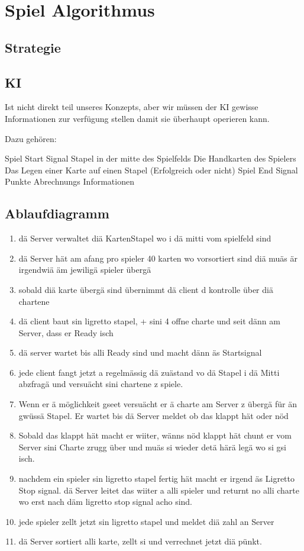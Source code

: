 \section{Spiel Algorithmus} 

\subsection{Strategie}

\subsection{KI}

Ist nicht direkt teil unseres Konzepts, aber wir müssen der KI gewisse Informationen zur verfügung stellen damit sie überhaupt operieren kann.

Dazu gehören:

Spiel Start Signal
Stapel in der mitte des Spielfelds
Die Handkarten des Spielers
Das Legen einer Karte auf einen Stapel (Erfolgreich oder nicht)
Spiel End Signal
Punkte Abrechnungs Informationen

\subsection{Ablaufdiagramm}

\begin{enumerate}
	\item dä Server verwaltet diä KartenStapel wo i dä mitti vom spielfeld sind
	\item dä Server hät am afang pro spieler 40 karten wo vorsortiert sind diä muäs är irgendwiä äm jewiligä spieler übergä
	\item sobald diä karte übergä sind übernimmt dä client d kontrolle über diä chartene
	\item dä client baut sin ligretto stapel, + sini 4 offne charte und seit dänn am Server, dass er Ready isch
	\item dä server wartet bis alli Ready sind und macht dänn äs Startsignal
	\item jede client fangt jetzt a regelmässig dä zuästand vo dä Stapel i dä Mitti abzfragä und versuächt sini chartene z spiele.
	\item Wenn er ä möglichkeit gseet versuächt er ä charte am Server z übergä für än gwüssä Stapel. Er wartet bis dä Server meldet ob das klappt hät oder nöd
	\item Sobald das klappt hät macht er wiiter, wänns nöd klappt hät chunt er vom Server sini Charte zrugg über und muäs si wieder detä härä legä wo si gsi isch.
	\item nachdem ein spieler sin ligretto stapel fertig hät macht er irgend äs Ligretto Stop signal. dä Server leitet das wiiter a alli spieler und returnt no alli charte wo erst nach däm ligretto stop signal acho sind.
	\item jede spieler zellt jetzt sin ligretto stapel und meldet diä zahl an Server
	\item dä Server sortiert alli karte, zellt si und verrechnet jetzt diä pünkt.
\end{enumerate}


